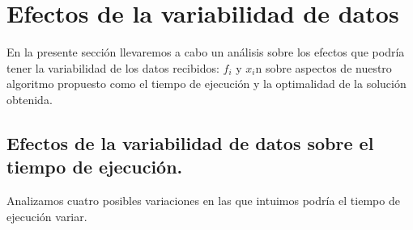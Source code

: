 \section{Efectos de la variabilidad de datos}\label{subsec:variabilidad}
En la presente sección llevaremos a cabo un análisis sobre los efectos que podría tener la variabilidad de los datos recibidos: $f_i$ y $x_i$n sobre aspectos de nuestro algoritmo propuesto como el tiempo de ejecución y la optimalidad de la solución obtenida. 
\subsection{Efectos de la variabilidad de datos sobre el tiempo de ejecución.}
Analizamos cuatro posibles variaciones en las que intuimos podría el tiempo de ejecución variar. 

